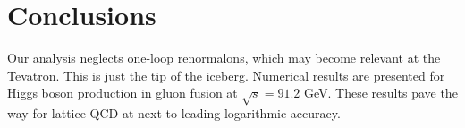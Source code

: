 \section{Conclusions}\label{sec:conclusions}

Our analysis neglects one-loop renormalons, which may become relevant at
the Tevatron. This is just the tip of the iceberg. Numerical results are
presented for Higgs boson production in gluon fusion at $\sqrt{s} =
91.2$ GeV. These results pave the way for lattice QCD at next-to-leading
logarithmic accuracy.


